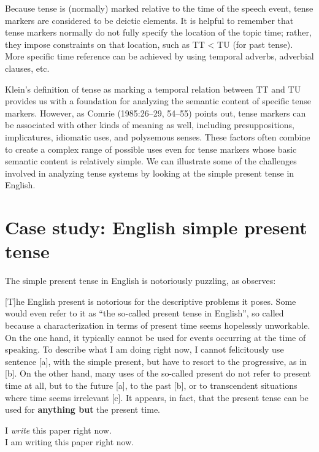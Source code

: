 Because tense is (normally) marked relative to the time of the speech event, tense markers are considered to be deictic elements. It is helpful to remember that tense markers normally do not fully specify the location of the topic time; rather, they impose constraints on that location, such as TT < TU (for past tense). More specific time reference can be achieved by using temporal adverbs, adverbial clauses, etc.



Klein’s definition of tense as marking a temporal relation between TT and TU provides us with a foundation for analyzing the semantic content of specific tense markers. However, as Comrie (1985:26–29, 54–55) points out, tense markers can be associated with other kinds of meaning as well, including presuppositions, implicatures, idiomatic uses, and polysemous senses. These factors often combine to create a complex range of possible uses even for tense markers whose basic semantic content is relatively simple. We can illustrate some of the challenges involved in analyzing tense systems by looking at the simple present tense in English.


\section{Case study: English simple present tense}\label{sec:} %

The simple present tense in English is notoriously puzzling, as \citet{Langacker2001} observes:


{}[T]he English present is notorious for the descriptive problems it poses. Some would even refer to it as “the so-called present tense in English”, so called because a characterization in terms of present time seems hopelessly unworkable. On the one hand, it typically cannot be used for events occurring at the time of speaking. To describe what I am doing right now, I cannot felicitously use sentence [a], with the simple present, but have to resort to the progressive, as in [b]. On the other hand, many uses of the so-called present do not refer to present time at all, but to the future [a], to the past [b], or to transcendent situations where time seems irrelevant [c]. It appears, in fact, that the present tense can be used for \textbf{anything but} the present time.

\ea
\ea *I \textit{write} this paper right now.\\
\ex I am writing this paper right now.
                       \z
\z

